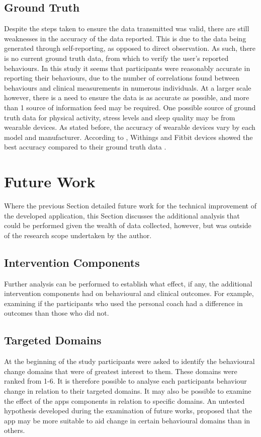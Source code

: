 \subsection{Ground Truth}
Despite the steps taken to ensure the data transmitted was valid, there are still weaknesses in the accuracy of the data reported. This is due to the data being generated through self-reporting, as opposed to direct observation. As such, there is no current ground truth data, from which to verify the user's reported behaviours. In this study it seems that participants were reasonably accurate in reporting their behaviours, due to the number of correlations found between behaviours and clinical measurements in numerous individuals. At a larger scale however, there is a need to ensure the data is as accurate as possible, and more than 1 source of information feed may be required.
One possible source of ground truth data for physical activity, stress levels and sleep quality may be from wearable devices. As stated before, the accuracy of wearable devices vary by each model and manufacturer. According to \citeauthor{Ferguson2015}, Withings and Fitbit devices showed the best accuracy compared to their ground truth data \cite{Ferguson2015}.

\section{Future Work}
Where the previous Section detailed future work for the technical improvement of the developed application, this Section discusses the additional analysis that could be performed given the wealth of data collected, however, but was outside of the research scope undertaken by the author.

\subsection{Intervention Components}
Further analysis can be performed to establish what effect, if any, the additional intervention components had on behavioural and clinical outcomes. For example, examining if the participants who used the personal coach had a difference in outcomes than those who did not.

\subsection{Targeted Domains}
At the beginning of the study participants were asked to identify the behavioural change domains that were of greatest interest to them. These domains were ranked from 1-6. It is therefore possible to analyse each participants behaviour change in relation to their targeted domains. It may also be possible to examine the effect of the apps components in relation to specific domains. An untested hypothesis developed during the examination of future works, proposed that the app may be more suitable to aid change in certain behavioural domains than in others.

